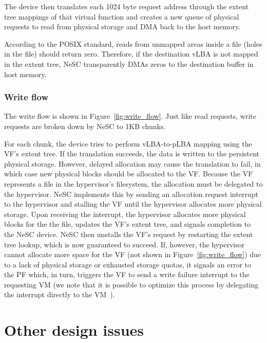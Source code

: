 The device then translates each 1024 byte request address through the extent tree mappings of that virtual function and creates a new queue of physical requests to read from physical storage and DMA back to the host memory.

According to the POSIX standard, reads from unmapped areas inside a file (holes in the file) should return zero. Therefore, if the destination vLBA is not mapped in the extent tree, NeSC transparently DMAs zeros to the destination buffer in host memory.

\subsubsection{Write flow}
\label{des:write}

The write flow is shown in Figure~\ref{fig:write_flow}. Just like read requests, write requests are broken down by NeSC to 1KB chunks.

For each chunk, the device tries to perform vLBA-to-pLBA mapping using the VF's extent tree. If the translation succeeds, the data is written to the persistent physical storage.
However, delayed allocation may cause the translation to fail, in which case new physical blocks should be allocated to the VF. Because the VF represents a file in the hypervisor's filesystem, the allocation must be delegated to the hypervisor. NeSC implements this by sending an allocation request interrupt to the hypervisor and stalling the VF until the hypervisor allocates more physical storage.
%
Upon receiving the interrupt, the hypervisor allocates more physical blocks for the the file, updates the VF's extent tree, and signals completion to the NeSC device. NeSC then unstalls the VF's request by restarting the extent tree lookup, which is now guaranteed to succeed. If, however, the hypervisor cannot allocate more space for the VF (not shown in Figure~\ref{fig:write_flow}) due to a lack of physical storage or exhausted storage quotas, it signals an error to the PF which, in turn, triggers the VF to send a write failure interrupt to the requesting VM (we note that it is possible to optimize this process by delegating the interrupt directly to the VM~\cite{gordon12eli}).

\section{Other design issues}

